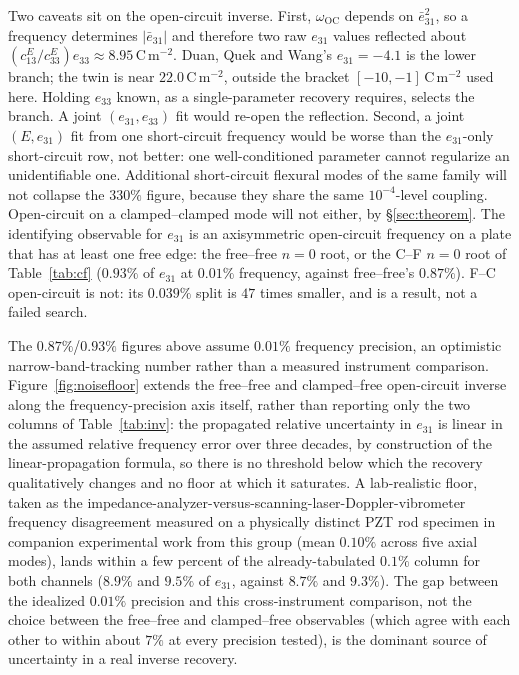 \documentclass[11pt]{article}
\newcommand{\eebar}{\bar{e}_{31}}
\begin{document}
Two caveats sit on the open-circuit inverse. First, $\omega_{\mathrm{OC}}$
depends on $\eebar^2$, so a frequency determines $|\eebar|$ and therefore
two raw $e_{31}$ values reflected about $(c_{13}^E/c_{33}^E)e_{33}\approx 8.95\,\mathrm{C\,m^{-2}}$.
Duan, Quek and Wang's $e_{31}=-4.1$ is the lower branch; the twin is near
$22.0\,\mathrm{C\,m^{-2}}$, outside the bracket $[-10,-1]\,\mathrm{C\,m^{-2}}$
used here. Holding
$e_{33}$ known, as a single-parameter recovery requires, selects the
branch. A joint $(e_{31},e_{33})$ fit would re-open the reflection.
Second, a joint $(E,e_{31})$ fit from one short-circuit frequency would
be worse than the $e_{31}$-only short-circuit row, not better: one
well-conditioned parameter cannot regularize an unidentifiable one.
Additional short-circuit flexural modes of the same family will not
collapse the $330\%$ figure, because they share the same
$10^{-4}$-level coupling. Open-circuit on a clamped--clamped mode will not either, by
\S\ref{sec:theorem}. The identifying observable for $e_{31}$ is an
axisymmetric open-circuit frequency on a plate that has at least one
free edge: the free--free $n=0$ root, or the C--F $n=0$ root of
Table~\ref{tab:cf} ($0.93\%$ of $e_{31}$ at $0.01\%$ frequency, against
free--free's $0.87\%$). F--C open-circuit is not: its $0.039\%$ split
is $47$ times smaller, and is a result, not a failed search.

The $0.87\%$/$0.93\%$ figures above assume $0.01\%$ frequency
precision, an optimistic narrow-band-tracking number rather than a
measured instrument comparison. Figure~\ref{fig:noisefloor} extends
the free--free and clamped--free open-circuit inverse along the
frequency-precision axis itself, rather than reporting only the two
columns of Table~\ref{tab:inv}: the propagated relative uncertainty
in $e_{31}$ is linear in the assumed relative frequency error over
three decades, by construction of the linear-propagation formula, so
there is no threshold below which the recovery qualitatively changes
and no floor at which it saturates. A lab-realistic floor, taken as
the impedance-analyzer-versus-scanning-laser-Doppler-vibrometer
frequency disagreement measured on a physically distinct PZT rod
specimen in companion experimental work from this group
\cite{boeringa2026} (mean $0.10\%$ across five axial modes), lands
within a few percent of the already-tabulated $0.1\%$ column for both
channels ($8.9\%$ and $9.5\%$ of $e_{31}$, against $8.7\%$ and
$9.3\%$). The gap between the idealized $0.01\%$ precision and this
cross-instrument comparison, not the choice between the free--free and
clamped--free observables (which agree with each other to within about
$7\%$ at every precision tested), is the dominant source of
uncertainty in a real inverse recovery.
\end{document}
